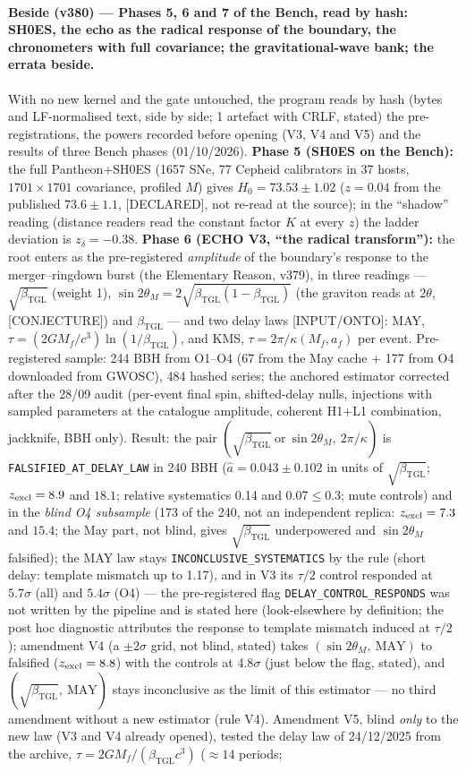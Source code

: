 \documentclass[11pt]{article}
\newcommand{\bTGL}{\beta_{\mathrm{TGL}}}\newcommand{\Msun}{M_{\odot}}\newcommand{\TGL}{\mathrm{TGL}}
\theoremstyle{definition}\newtheorem{deriv}{Derivation}
\begin{document}
\paragraph*{Beside (v380) --- Phases 5, 6 and 7 of the Bench, read by hash: SH0ES, the echo as the radical response of the boundary, the chronometers with full covariance; the gravitational-wave bank; the errata beside.} With no new kernel and the gate untouched, the program reads by hash (bytes and LF-normalised text, side by side; 1 artefact with CRLF, stated) the pre-registrations, the powers recorded before opening (V3, V4 and V5) and the results of three Bench phases (01/10/2026). \textbf{Phase 5 (SH0ES on the Bench):} the full Pantheon+SH0ES (1657 SNe, 77 Cepheid calibrators in 37 hosts, $1701\times1701$ covariance, profiled $M$) gives $H_0=73.53\pm1.02$ ($z=0.04$ from the published $73.6\pm1.1$, \textsf{[DECLARED]}, not re-read at the source); in the ``shadow'' reading (distance readers read the constant factor $K$ at every $z$) the ladder deviation is $z_\delta=-0.38$. \textbf{Phase 6 (ECHO V3, ``the radical transform''):} the root enters as the pre-registered \emph{amplitude} of the boundary's response to the merger--ringdown burst (the Elementary Reason, v379), in three readings --- $\sqrt{\bTGL}$ (weight 1), $\sin 2\theta_M=2\sqrt{\bTGL(1-\bTGL)}$ (the graviton reads at $2\theta$, \textsf{[CONJECTURE]}) and $\bTGL$ --- and two delay laws \textsf{[INPUT/ONTO]}: MAY, $\tau=(2GM_f/c^3)\ln(1/\bTGL)$, and KMS, $\tau=2\pi/\kappa(M_f,a_f)$ per event. Pre-registered sample: 244 BBH from O1--O4 (67 from the May cache + 177 from O4 downloaded from GWOSC), 484 hashed series; the anchored estimator corrected after the 28/09 audit (per-event final spin, shifted-delay nulls, injections with sampled parameters at the catalogue amplitude, coherent H1+L1 combination, jackknife, BBH only). Result: the pair $(\sqrt{\bTGL}\ \text{or}\ \sin 2\theta_M,\ 2\pi/\kappa)$ is \texttt{FALSIFIED\_AT\_DELAY\_LAW} in 240 BBH ($\hat a=0.043\pm0.102$ in units of $\sqrt{\bTGL}$; $z_{\rm excl}=8.9$ and $18.1$; relative systematics 0.14 and 0.07$\le0.3$; mute controls) and in the \emph{blind O4 subsample} (173 of the 240, not an independent replica: $z_{\rm excl}=7.3$ and $15.4$; the May part, not blind, gives $\sqrt{\bTGL}$ underpowered and $\sin 2\theta_M$ falsified); the MAY law stays \texttt{INCONCLUSIVE\_SYSTEMATICS} by the rule (short delay: template mismatch up to 1.17), and in V3 its $\tau/2$ control responded at $5.7\sigma$ (all) and $5.4\sigma$ (O4) --- the pre-registered flag \texttt{DELAY\_CONTROL\_RESPONDS} was not written by the pipeline and is stated here (look-elsewhere by definition; the post hoc diagnostic attributes the response to template mismatch induced at $\tau/2$); amendment V4 (a $\pm2\sigma$ grid, not blind, stated) takes $(\sin 2\theta_M,\ \text{MAY})$ to falsified ($z_{\rm excl}=8.8$) with the controls at 4.8$\sigma$ (just below the flag, stated), and $(\sqrt{\bTGL},\ \text{MAY})$ stays inconclusive as the limit of this estimator --- no third amendment without a new estimator (rule V4). Amendment V5, blind \emph{only} to the new law (V3 and V4 already opened), tested the delay law of 24/12/2025 from the archive, $\tau=2GM_f/(\bTGL c^3)$ ($\approx14$ periods; 
\end{document}
